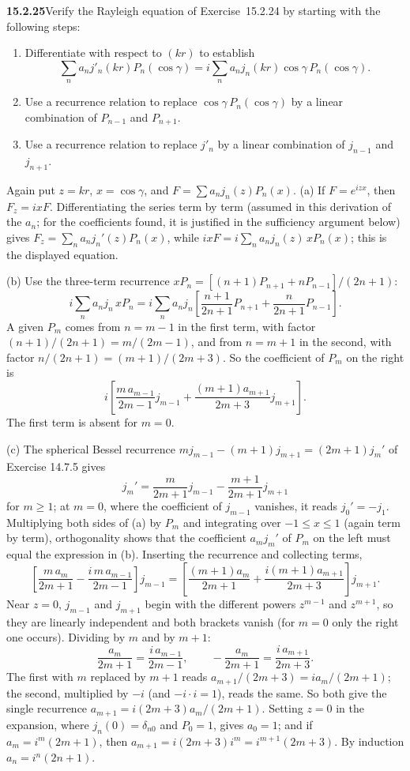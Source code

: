 \par\bigskip
\noindent\textbf{15.2.25}\quad Verify the Rayleigh equation of
Exercise~15.2.24 by starting with the following steps:
\begin{enumerate}
\item[(a)] Differentiate with respect to $(kr)$ to establish
\[
\sum_{n}a_{n}j'_{n}(kr)P_{n}(\cos\gamma)
=i\sum_{n}a_{n}j_{n}(kr)\cos\gamma\,P_{n}(\cos\gamma).
\]
\item[(b)] Use a recurrence relation to replace
$\cos\gamma\,P_{n}(\cos\gamma)$ by a linear combination of $P_{n-1}$
and $P_{n+1}$.
\item[(c)] Use a recurrence relation to replace $j'_{n}$ by a linear
combination of $j_{n-1}$ and $j_{n+1}$.
\end{enumerate}
\solution
Again put $z=kr$, $x=\cos\gamma$, and $F=\sum a_nj_n(z)P_n(x)$.
(a) If $F=e^{izx}$, then $F_z=ixF$. Differentiating the series term by
term (assumed in this derivation of the $a_n$; for the coefficients
found, it is justified in the sufficiency argument below) gives
$F_z=\sum_na_nj_n'(z)P_n(x)$, while
$ixF=i\sum_na_nj_n(z)\,xP_n(x)$; this is the displayed equation.

(b) Use the three-term recurrence
$xP_n=[(n+1)P_{n+1}+nP_{n-1}]/(2n+1)$:
\[
i\sum_na_nj_n\,xP_n
=i\sum_na_nj_n\left[\frac{n+1}{2n+1}P_{n+1}+\frac n{2n+1}P_{n-1}\right].
\]
A given $P_m$ comes from $n=m-1$ in the first term, with factor
$(n+1)/(2n+1)=m/(2m-1)$, and from $n=m+1$ in the second, with factor
$n/(2n+1)=(m+1)/(2m+3)$. So the coefficient of $P_m$ on the right is
\[
i\left[\frac{m\,a_{m-1}}{2m-1}j_{m-1}
+\frac{(m+1)a_{m+1}}{2m+3}j_{m+1}\right].
\]
The first term is absent for $m=0$.

(c) The spherical Bessel recurrence
$mj_{m-1}-(m+1)j_{m+1}=(2m+1)j_m'$ of Exercise 14.7.5 gives
\[
j_m'=\frac{m}{2m+1}j_{m-1}
-\frac{m+1}{2m+1}j_{m+1}
\]
for $m\ge1$; at $m=0$, where the coefficient of $j_{m-1}$ vanishes, it
reads $j_0'=-j_1$. Multiplying both sides of (a) by $P_m$ and
integrating over $-1\le x\le1$ (again term by term), orthogonality
shows that the coefficient $a_mj_m'$ of $P_m$ on the left must equal
the expression in (b). Inserting the recurrence and collecting terms,
\[
\left[\frac{m\,a_m}{2m+1}-\frac{i\,m\,a_{m-1}}{2m-1}\right]j_{m-1}
=\left[\frac{(m+1)a_m}{2m+1}+\frac{i(m+1)a_{m+1}}{2m+3}\right]j_{m+1}.
\]
Near $z=0$, $j_{m-1}$ and $j_{m+1}$ begin with the different powers
$z^{m-1}$ and $z^{m+1}$, so they are linearly independent and both
brackets vanish (for $m=0$ only the right one occurs). Dividing by $m$
and by $m+1$:
\[
\frac{a_m}{2m+1}=\frac{i\,a_{m-1}}{2m-1},\qquad
-\frac{a_m}{2m+1}=\frac{i\,a_{m+1}}{2m+3}.
\]
The first with $m$ replaced by $m+1$ reads $a_{m+1}/(2m+3)=ia_m/(2m+1)$;
the second, multiplied by $-i$ (and $-i\cdot i=1$), reads the same. So both
give the single recurrence $a_{m+1}=i(2m+3)a_m/(2m+1)$. Setting $z=0$
in the expansion, where $j_n(0)=\delta_{n0}$ and $P_0=1$, gives
$a_0=1$; and if $a_m=i^m(2m+1)$, then
$a_{m+1}=i(2m+3)i^m=i^{m+1}(2m+3)$. By induction $a_n=i^n(2n+1)$.

